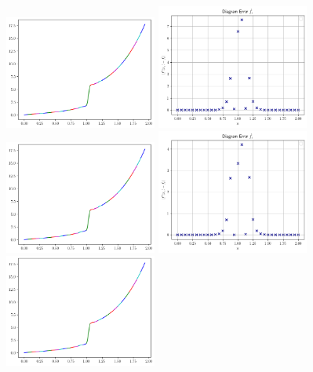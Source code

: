 \begin{figure}[H]
    \centering
    \includegraphics[width=5cm]{Images/figure_2/grafikOFB2.png}
    \includegraphics[width=5cm]{Images/figure_2/plotOFB2.png}
    \\
    \includegraphics[width=5cm]{Images/figure_2/grafikOAY2.png}
    \includegraphics[width=5cm]{Images/figure_2/plotOAY2.png}
    \\
    \includegraphics[width=5cm]{Images/figure_2/grafikRFB2.png}

\end{figure}
